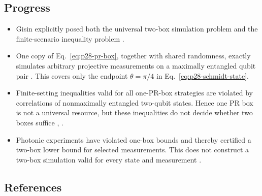 \subsection*{Progress}

\begin{itemize}
  \item Gisin explicitly posed both the universal two-box simulation problem
  and the finite-scenario inequality problem
  .

  \item One copy of Eq.~\eqref{eq:p28-pr-box}, together with shared
  randomness, exactly simulates arbitrary projective measurements on a
  maximally entangled qubit pair .  This
  covers only the endpoint $\theta=\pi/4$ in
  Eq.~\eqref{eq:p28-schmidt-state}.

  \item Finite-setting inequalities valid for all one-PR-box strategies are
  violated by correlations of nonmaximally entangled two-qubit states.
  Hence one PR box is not a universal resource, but these inequalities do not
  decide whether two boxes suffice
  ,
  .

  \item Photonic experiments have violated one-box bounds and thereby
  certified a two-box lower bound for selected measurements.  This does not
  construct a two-box simulation valid for every state and measurement
  .
\end{itemize}

\subsection*{References}

